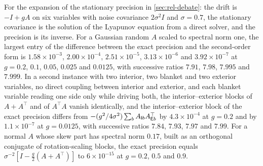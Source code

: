 \begin{numcheck}\label{chk:col-sparse-expansion}
For the expansion of the stationary precision in \cref{sec:rel-debate}: the drift is $-I+gA$ on six variables with noise covariance $2\sigma^2I$ and $\sigma=0.7$, the stationary covariance is the solution of the Lyapunov equation from a direct solver, and the precision is its inverse. For a Gaussian random $A$ scaled to spectral norm one, the largest entry of the difference between the exact precision and the second-order form is $1.58\times10^{-3}$, $2.00\times10^{-4}$, $2.51\times10^{-5}$, $3.13\times10^{-6}$ and $3.92\times10^{-7}$ at $g=0.2$, $0.1$, $0.05$, $0.025$ and $0.0125$, with successive ratios $7.91$, $7.98$, $7.995$ and $7.999$. In a second instance with two interior, two blanket and two exterior variables, no direct coupling between interior and exterior, and each blanket variable reading one side only while driving both, the interior--exterior blocks of $A+A^\top$ and of $A^\top A$ vanish identically, and the interior--exterior block of the exact precision differs from $-(g^2/4\sigma^2)\sum_{b}A_{\mathsf{I} b}A_{\mathsf{E} b}^\top$ by $4.3\times10^{-4}$ at $g=0.2$ and by $1.1\times10^{-7}$ at $g=0.0125$, with successive ratios $7.84$, $7.93$, $7.97$ and $7.99$. For a normal $A$ whose skew part has spectral norm $0.17$, built as an orthogonal conjugate of rotation-scaling blocks, the exact precision equals $\sigma^{-2}[I-\frac g2(A+A^\top)]$ to $6\times10^{-15}$ at $g=0.2$, $0.5$ and $0.9$.
\end{numcheck}
